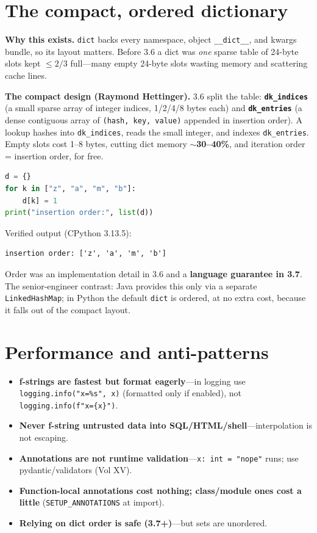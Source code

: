 \section{The compact, ordered dictionary}

\textbf{Why this exists.} \texttt{dict} backs every namespace, object \texttt{\_\_dict\_\_}, and
kwargs bundle, so its layout matters. Before 3.6 a dict was \emph{one} sparse table of 24-byte
slots kept $\le 2/3$ full---many empty 24-byte slots wasting memory and scattering cache lines.

\textbf{The compact design (Raymond Hettinger).} 3.6 split the table: \textbf{\texttt{dk\_indices}}
(a small sparse array of integer indices, 1/2/4/8 bytes each) and \textbf{\texttt{dk\_entries}}
(a dense contiguous array of \texttt{(hash, key, value)} appended in insertion order). A lookup
hashes into \texttt{dk\_indices}, reads the small integer, and indexes \texttt{dk\_entries}. Empty
slots cost 1--8 bytes, cutting dict memory \textbf{$\sim$30--40\%}, and iteration order = insertion
order, for free.

\begin{lstlisting}[language=Python, caption={The compact dict preserves insertion order (impl detail in 3.6, guaranteed since 3.7).}]
d = {}
for k in ["z", "a", "m", "b"]:
    d[k] = 1
print("insertion order:", list(d))
\end{lstlisting}

Verified output (CPython 3.13.5):

\begin{lstlisting}[caption={Output}]
insertion order: ['z', 'a', 'm', 'b']
\end{lstlisting}

Order was an implementation detail in 3.6 and a \textbf{language guarantee in 3.7}. The
senior-engineer contrast: Java provides this only via a separate \texttt{LinkedHashMap}; in Python
the default \texttt{dict} is ordered, at no extra cost, because it falls out of the compact layout.

\section{Performance and anti-patterns}

\begin{itemize}
  \item \textbf{f-strings are fastest but format eagerly}---in logging use
    \texttt{logging.info("x=\%s", x)} (formatted only if enabled), not \texttt{logging.info(f"x=\{x\}")}.
  \item \textbf{Never f-string untrusted data into SQL/HTML/shell}---interpolation is not escaping.
  \item \textbf{Annotations are not runtime validation}---\texttt{x: int = "nope"} runs; use
    pydantic/validators (Vol XV).
  \item \textbf{Function-local annotations cost nothing; class/module ones cost a little}
    (\texttt{SETUP\_ANNOTATIONS} at import).
  \item \textbf{Relying on dict order is safe (3.7+)}---but sets are unordered.
\end{itemize}

